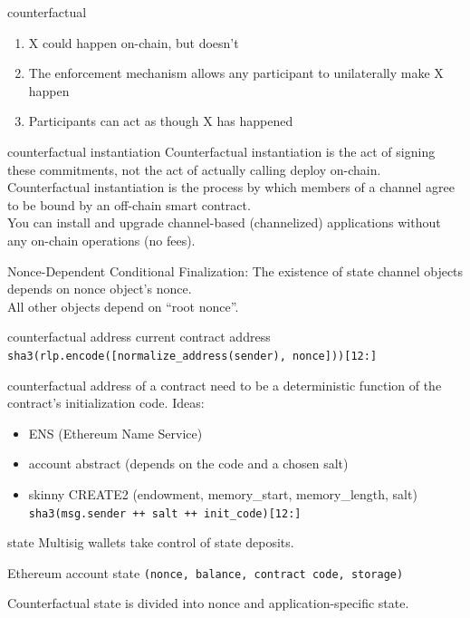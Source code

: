 \documentclass{beamer}
\begin{document}
\begin{frame}{counterfactual}
\begin{enumerate}
\item X could happen on-chain, but doesn’t
\item The enforcement mechanism allows any participant to unilaterally make X happen
\item Participants can act as though X has happened
\end{enumerate}
\end{frame}

\begin{frame}{counterfactual instantiation}
Counterfactual instantiation is the act of signing these commitments, not the act of actually calling deploy on-chain.\\
Counterfactual instantiation is the process by which members of a channel agree to be bound by an off-chain smart contract.\\
You can install and upgrade channel-based (channelized) applications without any on-chain operations (no fees).

Nonce-Dependent Conditional Finalization: The existence of state channel objects depends on nonce object's nonce.\\
All other objects depend on ``root nonce''.
\end{frame}

\begin{frame}{counterfactual address}
current contract address \texttt{sha3(rlp.encode([normalize\_address(sender), nonce]))[12:]}

counterfactual address of a contract need to be a deterministic function of the contract's initialization code. Ideas:
\begin{itemize}
\item ENS (Ethereum Name Service)
\item account abstract (depends on the code and a chosen salt)
\item skinny CREATE2 (endowment, memory\_start, memory\_length, salt) \texttt{sha3(msg.sender ++ salt ++ init\_code)[12:]}
\end{itemize}
\end{frame}

\begin{frame}{state}
Multisig wallets take control of state deposits.

Ethereum account state \texttt{(nonce, balance, contract code, storage)}

Counterfactual state is divided into nonce and application-specific state.
\end{frame}
\end{document}
